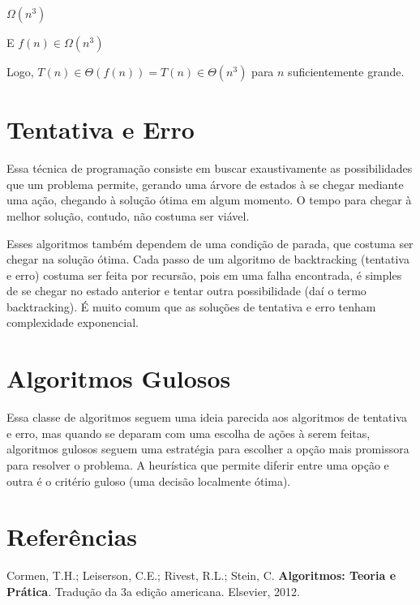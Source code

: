 \documentclass[a4paper, twocolumn]{article}
\theoremstyle{definition}
\begin{document}
	$\Omega(n^{3})$
	
	E $f(n) \in \Omega(n^{3})$
	
	Logo, $T(n) \in \Theta(f(n)) = T(n) \in \Theta(n^3)$ para $n$ suficientemente grande.
	
	\section{Tentativa e Erro}
	Essa técnica de programação consiste em buscar exaustivamente as possibilidades que um problema permite, gerando uma árvore de estados à se chegar mediante uma ação, chegando à solução ótima em algum momento. O tempo para chegar à melhor solução, contudo, não costuma ser viável.
	
	Esses algoritmos também dependem de uma condição de parada, que costuma ser chegar na solução ótima. Cada passo de um algoritmo de backtracking (tentativa e erro) costuma ser feita por recursão, pois em uma falha encontrada, é simples de se chegar no estado anterior e tentar outra possibilidade (daí o termo backtracking). É muito comum que as soluções de tentativa e erro tenham complexidade exponencial.
	
	\section{Algoritmos Gulosos}
	Essa classe de algoritmos seguem uma ideia parecida aos algoritmos de tentativa e erro, mas quando se deparam com uma escolha de ações à serem feitas, algoritmos gulosos seguem uma estratégia para escolher a opção mais promissora para resolver o problema. A heurística que permite diferir entre uma opção e outra é o critério guloso (uma decisão localmente ótima).
	
	
	\section{Referências}
	Cormen, T.H.; Leiserson, C.E.; Rivest, R.L.; Stein, C. \textbf{Algoritmos: Teoria e Prática}. Tradução da 3a edição americana. Elsevier, 2012.   
\end{document}
